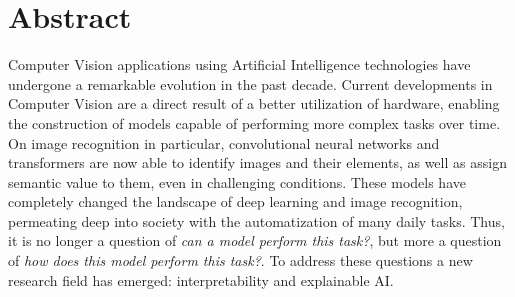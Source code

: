 \chapter*{Abstract}
Computer Vision applications using Artificial Intelligence technologies have undergone a remarkable 
evolution in the past decade. Current developments in Computer Vision are a direct result of a 
better utilization of hardware, enabling the construction of models capable of performing more 
complex tasks over time. On image recognition in particular, convolutional neural networks and 
transformers are now able to identify images and their elements, as well as assign semantic value 
to them, even in challenging conditions. These models have completely changed the landscape of deep 
learning and image recognition, permeating deep into society with the automatization of many daily 
tasks. Thus, it is no longer a question of \emph{can a model perform 
this task?}, but more a question of \emph{how does this model perform this task?}. To address these 
questions a new research field has emerged: interpretability and explainable AI.\\
\\


